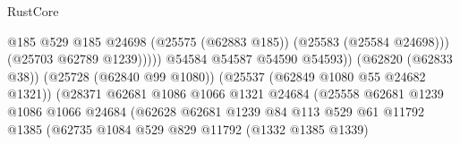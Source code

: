 \begin{lexlean}{RustCore}
\begin{coremodule}
                                                              @185
                                                              @529
                                                              @185
                                                              @24698
                                                              (@25575 (@62883 @185))
                                                              (@25583 (@25584 @24698)))
                                                            (@25703 @62789 @1239)))))
                                                    @54584
                                                    @54587
                                                    @54590
                                                    @54593))
                                                (@62820 (@62833 @38))
                                                (@25728 (@62840 @99 @1080))
                                                (@25537 (@62849 @1080 @55 @24682 @1321))
                                                (@28371
                                                  @62681
                                                  @1086
                                                  @1066
                                                  @1321
                                                  @24684
                                                  (@25558
                                                    @62681
                                                    @1239
                                                    @1086
                                                    @1066
                                                    @24684
                                                    (@62628
                                                      @62681
                                                      @1239
                                                      @84
                                                      @113
                                                      @529
                                                      @61
                                                      @11792
                                                      @1385
                                                      (@62735
                                                        @1084
                                                        @529
                                                        @829
                                                        @11792
                                                        (@1332 @1385 @1339)

\end{coremodule}
\end{lexlean}
